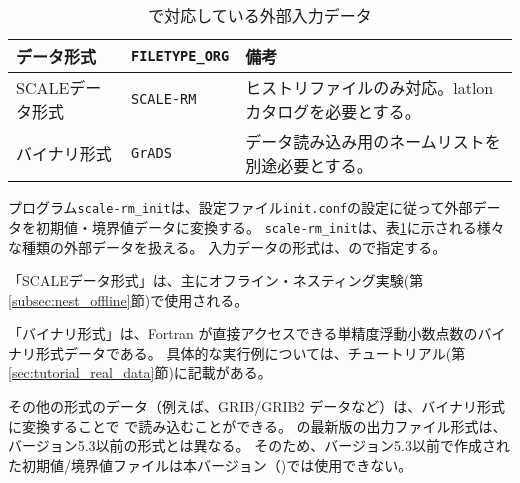 \section{\SecInputDataSetting} \label{sec:adv_datainput}

\begin{table}[htb]
\begin{center}
\caption{\scalelib で対応している外部入力データ}
\begin{tabularx}{150mm}{|l|l|X|} \hline
 \rowcolor[gray]{0.9} データ形式      & \verb|FILETYPE_ORG|  & 備考 \\ \hline
 SCALEデータ形式   & \verb|SCALE-RM|     &  ヒストリファイルのみ対応。latlonカタログを必要とする。 \\ \hline
 バイナリ形式 & \verb|GrADS|        & データ読み込み用のネームリストを別途必要とする。       \\ \hline
\end{tabularx}
\label{tab:inputdata_format}
\end{center}
\end{table}

プログラム\verb|scale-rm_init|は、設定ファイル\verb|init.conf|の設定に従って外部データを初期値・境界値データに変換する。
\verb|scale-rm_init|は、表\ref{tab:inputdata_format}に示される様々な種類の外部データを扱える。
入力データの形式は、ので指定する。

「SCALEデータ形式」は、主にオフライン・ネスティング実験(第\ref{subsec:nest_offline}節)で使用される。


「バイナリ形式」は、Fortran が直接アクセスできる単精度浮動小数点数のバイナリ形式データである。
具体的な実行例については、チュートリアル(第\ref{sec:tutorial_real_data}節)に記載がある。


その他の形式のデータ（例えば、GRIB/GRIB2 データなど）は、バイナリ形式に変換することで {\scalerm} で読み込むことができる。
{\scalelib}の最新版の出力ファイル形式は、バージョン5.3以前の形式とは異なる。
そのため、バージョン5.3以前で作成された初期値/境界値ファイルは本バージョン（{\scalelib}{\version})では使用できない。

